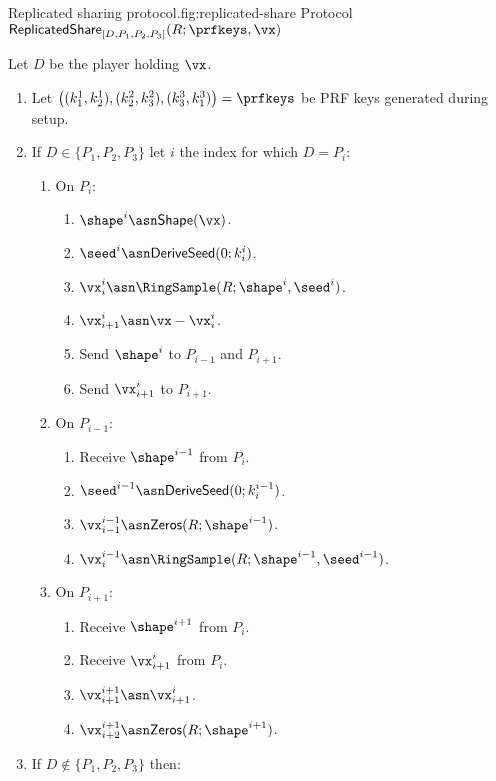 
\begin{Boxfig}{Replicated sharing protocol.}{fig:replicated-share}
  {Protocol $\mathsf{ReplicatedShare}_{[D, P_1, P_2, P_3]}(R; \prfkeys, \vx)$}

  Let $D$ be the player holding $\vx$.

  \begin{enumerate}
  \item Let $\left( (k_1^1, k_2^1), (k_2^2, k_3^2), (k_3^3, k_1^3) \right) = \prfkeys$ be PRF keys generated during setup.
  \item If $D \in \{P_1, P_2, P_3\}$ let $i$ the index for which $D = P_i$:

    \begin{enumerate}
    \item On $P_i$:
      \begin{enumerate}
        \item $\shape^i \asn \mathsf{Shape}(\vx)$.
        \item ${\seed}^i \asn \mathsf{DeriveSeed}(0; k^i_i)$.
        \item $\vx_i^i \asn \RingSample(R; \shape^i, \seed^i)$.
        \item $\vx_{i+1}^i \asn \vx - \vx_i^i$.
        \item Send $\shape^i$ to $P_{i-1}$ and $P_{i+1}$.
        \item Send $\vx_{i+1}^i$ to $P_{i+1}$.
      \end{enumerate}

    \item On $P_{i-1}$:
      \begin{enumerate}
        \item Receive $\shape^{i-1}$ from $P_i$.
        \item ${\seed}^{i-1} \asn \mathsf{DeriveSeed}(0; k^{i-1}_i)$.
        \item $\vx_{i-1}^{i-1} \asn \mathsf{Zeros}(R; \shape^{i-1})$.
        \item $\vx_i^{i-1} \asn \RingSample(R; \shape^{i-1}, \seed^{i-1})$.
      \end{enumerate}

    \item On $P_{i+1}$:
      \begin{enumerate}
        \item Receive $\shape^{i+1}$ from $P_i$.
        \item Receive $\vx_{i+1}^i$ from $P_i$.
        \item $\vx_{i+1}^{i+1} \asn \vx_{i+1}^i$.
        \item $\vx_{i+2}^{i+1} \asn \mathsf{Zeros}(R; \shape^{i+1})$.
      \end{enumerate}
    \end{enumerate}
  \item If $D \notin \{P_1, P_2, P_3\}$ then:


\end{enumerate}
\end{Boxfig}
